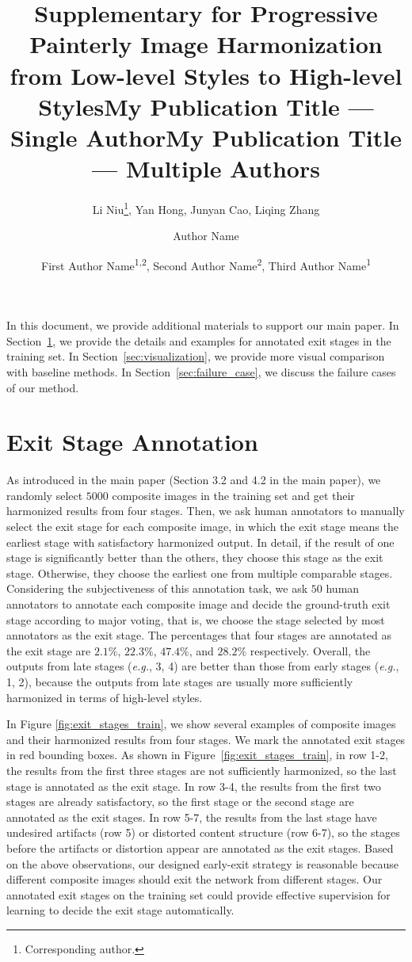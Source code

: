 \documentclass[letterpaper]{article} %
\title{Supplementary for Progressive Painterly Image Harmonization from Low-level Styles to High-level Styles}
\author{
    Li Niu\thanks{Corresponding author.},
    Yan Hong, 
    Junyan Cao, 
    Liqing Zhang 
    \\
}
\title{My Publication Title --- Single Author}
\author {
    Author Name
}
\title{My Publication Title --- Multiple Authors}
\author {
    First Author Name\textsuperscript{\rm 1,\rm 2},
    Second Author Name\textsuperscript{\rm 2},
    Third Author Name\textsuperscript{\rm 1}
}
\begin{document}
\maketitle

In this document, we provide additional materials to support our main paper. 
In Section~\ref{sec:exit_stage_annotation}, we provide the details and examples for annotated exit stages in the training set. In Section~\ref{sec:visualization}, we provide more visual comparison with baseline methods. In Section~\ref{sec:failure_case}, we discuss the failure cases of our method. 


\section{Exit Stage Annotation} \label{sec:exit_stage_annotation}

As introduced in the main paper (Section 3.2 and 4.2 in the main paper),  we randomly select $5000$ composite images in the training set and get their harmonized results from four stages. Then, we ask human annotators to manually select the exit stage for each composite image, in which the exit stage means the earliest stage with satisfactory harmonized output. 
In detail, if the result of one stage is significantly better than the others, they choose this stage as the exit stage. Otherwise, they choose the earliest one from multiple comparable stages. 
Considering the subjectiveness of this annotation task, we ask $50$ human annotators to annotate each composite image and decide the ground-truth exit stage according to major voting, that is, we choose the stage selected by most annotators as the exit stage. The percentages that four stages are annotated as the exit stage are $2.1\%$, $22.3\%$, $47.4\%$, and $28.2\%$ respectively. Overall, the outputs from late stages (\emph{e.g.}, 3, 4) are better than those from early stages (\emph{e.g.}, 1, 2), because the outputs from late stages are usually more sufficiently harmonized in terms of high-level styles. 

In Figure \ref{fig:exit_stages_train}, we show several examples of composite images and their harmonized results from four stages. We mark the annotated exit stages in red bounding boxes. 
As shown in Figure~\ref{fig:exit_stages_train}, in row 1-2, the results from the first three stages are not sufficiently harmonized, so the last stage is annotated as the exit stage. In row 3-4,  the results from the first two stages are already satisfactory, so the first stage or the second stage are annotated as the exit stages. In row 5-7, the results from the last stage have undesired artifacts (row 5) or distorted content structure (row 6-7), so the stages before the artifacts or distortion appear are annotated as the exit stages. Based on the above observations, our designed early-exit strategy is reasonable because different composite images should exit the network from different stages. Our annotated exit stages on the training set could provide effective supervision for learning to decide the exit stage automatically. 
\end{document}
